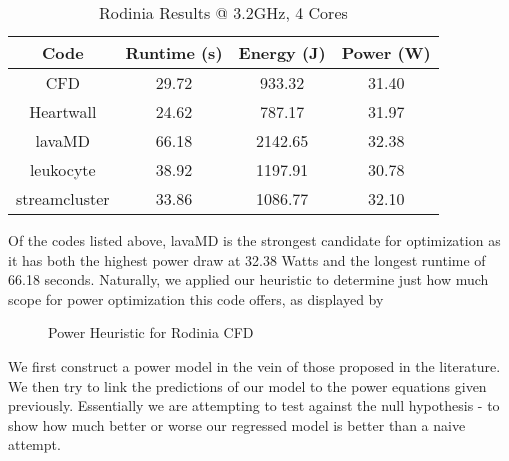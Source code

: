 \begin{table}
\centering
\small
\begin{tabular}{@{}cccc@{}} \toprule
Code & Runtime (s) & Energy (J) & Power (W) \\ \midrule 
CFD & 29.72 & 933.32 & 31.40  \\ 
Heartwall & 24.62 & 787.17 & 31.97 \\ 
lavaMD & 66.18 & 2142.65 & 32.38 \\ 
leukocyte &  38.92 & 1197.91 & 30.78 \\ 
streamcluster & 33.86 & 1086.77 & 32.10 \\ 
\bottomrule
\end{tabular}
   \vspace{0.5\baselineskip}
\caption{Rodinia Results @ 3.2GHz, 4 Cores}
\label{tab:coderesults}
\end{table} 

Of the codes listed above, lavaMD is the strongest candidate for optimization as it has both the highest power draw at 32.38 Watts and the longest runtime of 66.18 seconds. Naturally, we applied our heuristic to determine just how much scope for power optimization this code offers, as displayed by \figurename~




\begin{figure}
\label{fig:modelpoints}

\caption{Power Heuristic for Rodinia CFD}
\end{figure}

	
	

We first construct a power model in the vein of those proposed in the literature. We then try to link the predictions of our model to the power equations given previously. Essentially we are attempting to test against the null hypothesis - to show how much better or worse our regressed model is better than a naive attempt.






